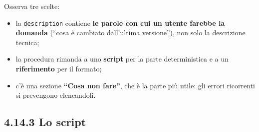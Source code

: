 \documentclass[
  italian,
  10pt,
]{book}
\providecommand{\tightlist}{%
  \setlength{\itemsep}{0pt}\setlength{\parskip}{0pt}}
\begin{document}
Osserva tre scelte:

\begin{itemize}
\tightlist
\item
  la \texttt{description} contiene \textbf{le parole con cui un utente
  farebbe la domanda} (``cosa è cambiato dall'ultima versione''), non
  solo la descrizione tecnica;
\item
  la procedura rimanda a uno \textbf{script} per la parte deterministica
  e a un \textbf{riferimento} per il formato;
\item
  c'è una sezione \textbf{``Cosa non fare''}, che è la parte più utile:
  gli errori ricorrenti si prevengono elencandoli.
\end{itemize}

\subsection{4.14.3 Lo script}\label{lo-script}
\end{document}

